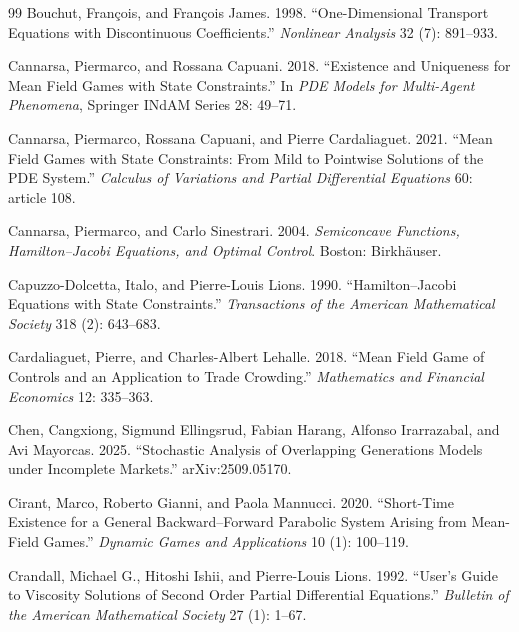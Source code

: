 \documentclass[11pt]{article}
\theoremstyle{definition}
\theoremstyle{remark}
\begin{document}
\begin{thebibliography}{99}
Bouchut, Fran\c{c}ois, and Fran\c{c}ois James. 1998.
``One-Dimensional Transport Equations with Discontinuous
Coefficients.'' \emph{Nonlinear Analysis} 32 (7): 891--933.

Cannarsa, Piermarco, and Rossana Capuani. 2018. ``Existence and
Uniqueness for Mean Field Games with State Constraints.'' In
\emph{PDE Models for Multi-Agent Phenomena}, Springer INdAM Series
28: 49--71.

Cannarsa, Piermarco, Rossana Capuani, and Pierre Cardaliaguet. 2021.
``Mean Field Games with State Constraints: From Mild to Pointwise
Solutions of the PDE System.'' \emph{Calculus of Variations and
Partial Differential Equations} 60: article 108.

Cannarsa, Piermarco, and Carlo Sinestrari. 2004. \emph{Semiconcave
Functions, Hamilton--Jacobi Equations, and Optimal Control}.
Boston: Birkh\"auser.

Capuzzo-Dolcetta, Italo, and Pierre-Louis Lions. 1990.
``Hamilton--Jacobi Equations with State Constraints.''
\emph{Transactions of the American Mathematical Society} 318 (2):
643--683.

Cardaliaguet, Pierre, and Charles-Albert Lehalle. 2018. ``Mean Field
Game of Controls and an Application to Trade Crowding.''
\emph{Mathematics and Financial Economics} 12: 335--363.

Chen, Cangxiong, Sigmund Ellingsrud, Fabian Harang, Alfonso
Irarrazabal, and Avi Mayorcas. 2025. ``Stochastic Analysis of
Overlapping Generations Models under Incomplete Markets.''
arXiv:2509.05170.

Cirant, Marco, Roberto Gianni, and Paola Mannucci. 2020. ``Short-Time
Existence for a General Backward--Forward Parabolic System Arising
from Mean-Field Games.'' \emph{Dynamic Games and Applications} 10
(1): 100--119.

Crandall, Michael G., Hitoshi Ishii, and Pierre-Louis Lions. 1992.
``User's Guide to Viscosity Solutions of Second Order Partial
Differential Equations.'' \emph{Bulletin of the American Mathematical
Society} 27 (1): 1--67.


\end{thebibliography}
\end{document}
